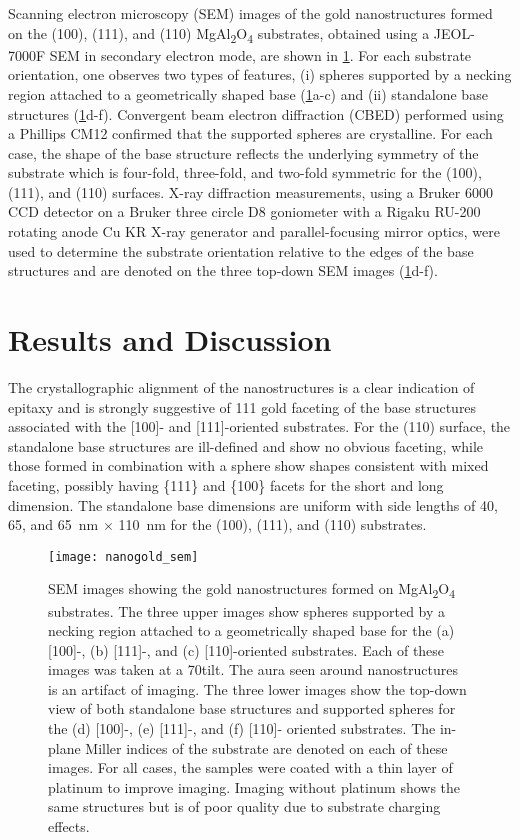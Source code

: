 Scanning electron microscopy (SEM) images of the gold nanostructures formed on the (100), (111), and (110) MgAl\textsubscript{2}O\textsubscript{4} substrates, obtained using a JEOL-7000F SEM in secondary electron mode, are shown in \cref{fig:nanogold_sem}.
For each substrate orientation, one observes two types of features, (i) spheres supported by a necking region attached to a geometrically shaped base (\cref{fig:nanogold_sem}a-c) and (ii) standalone base structures (\cref{fig:nanogold_sem}d-f).
Convergent beam electron diffraction (CBED) performed using a Phillips CM12 confirmed that the supported spheres are crystalline.
For each case, the shape of the base structure reflects the underlying symmetry of the substrate which is four-fold, three-fold, and two-fold symmetric for the (100), (111), and (110) surfaces.
X-ray diffraction measurements, using a Bruker 6000 CCD detector on a Bruker three circle D8 goniometer with a Rigaku RU-200 rotating anode Cu KR X-ray generator and parallel-focusing mirror optics, were used to determine the substrate orientation relative to the edges of the base structures and are denoted on the three top-down SEM images (\cref{fig:nanogold_sem}d-f).
\section{Results and Discussion}
The crystallographic alignment of the nanostructures is a clear indication of epitaxy and is strongly suggestive of {111} gold faceting of the base structures associated with the [100]- and [111]-oriented substrates.
For the (110) surface, the standalone base structures are ill-defined and show no obvious faceting, while those formed in combination with a sphere show shapes consistent with mixed faceting, possibly having \{111\} and \{100\} facets for the short and long dimension.
The standalone base dimensions are uniform with side lengths of 40, 65, and 65~nm \(\times\) 110~nm for the (100), (111), and (110) substrates.
\begin{figure}
 \centering \texttt{[image: nanogold\_sem]}
 \caption[SEM images of gold nanostructures]{\label{fig:nanogold_sem}SEM images showing the gold nanostructures formed on MgAl\textsubscript{2}O\textsubscript{4} substrates.
  The three upper images show spheres supported by a necking region attached to a geometrically shaped base for the (a) [100]-, (b) [111]-, and (c) [110]-oriented substrates.
  Each of these images was taken at a 70\degree tilt.
  The aura seen around nanostructures is an artifact of imaging.
  The three lower images show the top-down view of both standalone base structures and supported spheres for the (d) [100]-, (e) [111]-, and (f) [110]- oriented substrates.
  The in-plane Miller indices of the substrate are denoted on each of these images.
  For all cases, the samples were coated with a thin layer of platinum to improve imaging.
  Imaging without platinum shows the same structures but is of poor quality due to substrate charging effects.}
\end{figure}


